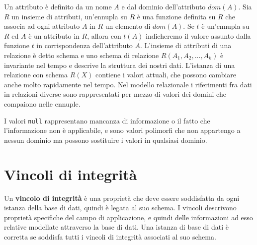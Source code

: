 Un attributo è definito da un nome $A$ e dal dominio dell'attributo $dom(A)$. Sia $R$ un insieme di attributi, un'ennupla su $R$ è una funzione definita su $R$ che associa ad ogni attributo $A$ in $R$ un elemento di $dom(A)$. Se $t$ è un'ennupla su $R$ ed $A$ è un attributo in $R$, allora con $t(A)$ indicheremo il valore assunto dalla funzione $t$ in corrispondenza dell'attributo $A$. L'insieme di attributi di una relazione è detto schema e uno schema di relazione $R(A_1,A_2,...,A_k)$ è invariante nel tempo e descrive la struttura dei nostri dati. L'istanza di una relazione con schema $R(X)$ contiene i valori attuali, che possono cambiare anche molto rapidamente nel tempo. Nel modello relazionale i riferimenti fra dati in relazioni diverse sono rappresentati per mezzo di valori dei domini che compaiono nelle ennuple. 

I valori \verb|null| rappresentano mancanza di informazione o il fatto che l'informazione non è applicabile, e sono valori polimorfi che non appartengo a nessun dominio ma possono sostituire i valori in qualsiasi dominio.

\section{Vincoli di integrità}
\begin{redbar}
    Un \textbf{vincolo di integrità} è una proprietà che deve essere soddisfatta da ogni istanza della base di dati, quindi è legata al suo schema. I vincoli descrivono proprietà specifiche del campo di applicazione, e quindi delle informazioni ad esso relative modellate attraverso la base di dati. Una istanza di base di dati è corretta se soddisfa tutti i vincoli di integrità associati al suo schema.
\end{redbar}

